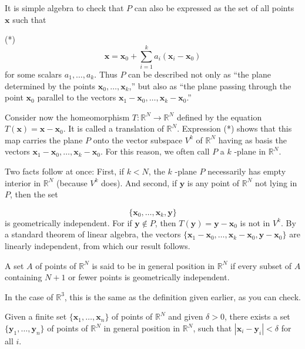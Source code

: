 It is simple algebra to check that \(P\) can also be expressed as the set of all points \(\mathbf{x}\) such that

(*)
\[
\mathbf{x} = \mathbf{x}_{0} + \mathop{\sum }\limits_{{i = 1}}^{k}a_{i}({\mathbf{x}_{i} - \mathbf{x}_{0}})
\]
for some scalars \(a_{1},\ldots ,a_{k}\). Thus \(P\) can be described not only as ``the plane determined by the points \(\mathbf{x}_{0},\ldots ,\mathbf{x}_{k}\),'' but also as ``the plane passing through the point \(\mathbf{x}_{0}\) parallel to the vectors \(\mathbf{x}_{1} - \mathbf{x}_{0},\ldots ,\mathbf{x}_{k} - \mathbf{x}_{0}\).''

Consider now the homeomorphism \(T : \mathbb{R}^{N} \rightarrow {\mathbb{R}}^{N}\) defined by the equation \(T( \mathbf{x}) = \mathbf{x} - \mathbf{x}_{0}\). It is called a translation of \(\mathbb{R}^{N}\). Expression (*) shows that this map carries the plane \(P\) onto the vector subspace \(V^{k}\) of \(\mathbb{R}^{N}\) having as basis the vectors \(\mathbf{x}_{1} - \mathbf{x}_{0},\ldots ,\mathbf{x}_{k} - \mathbf{x}_{0}\). For this reason, we often call \(P\) a \(k\) -plane in \(\mathbb{R}^{N}\).

Two facts follow at once: First, if \(k < N\), the \(k\) -plane \(P\) necessarily has empty interior in \(\mathbb{R}^{N}\) (because \(V^{k}\) does). And second, if \(\mathbf{y}\) is any point of \(\mathbb{R}^{N}\) not lying in \(P\), then the set

\[
\{ {\mathbf{x}_{0},\ldots ,\mathbf{x}_{k},\mathbf{y}}\}
\]
is geometrically independent. For if \(\mathbf{y} \notin P\), then \(T( \mathbf{y}) = \mathbf{y} - \mathbf{x}_{0}\) is not in \(V^{k}\). By a standard theorem of linear algebra, the vectors \(\{ {\mathbf{x}_{1} - \mathbf{x}_{0},\ldots ,\mathbf{x}_{k} - \mathbf{x}_{0},\mathbf{y} - \mathbf{x}_{0}}\}\) are linearly independent, from which our result follows.

\begin{definition}
A set \(A\) of points of \(\mathbb{R}^{N}\) is said to be in general position in \(\mathbb{R}^{N}\) if every subset of \(A\) containing \(N + 1\) or fewer points is geometrically independent.
\end{definition}

In the case of \(\mathbb{R}^{3}\), this is the same as the definition given earlier, as you can check.

\begin{lemma}
\label{lem:\thetheorem}
Given a finite set \(\{ {\mathbf{x}_{1},\ldots ,\mathbf{x}_{n}}\}\) of points of \(\mathbb{R}^{N}\) and given \(\delta > 0\), there exists a set \(\{ {\mathbf{y}_{1},\ldots ,\mathbf{y}_{n}}\}\) of points of \(\mathbb{R}^{N}\) in general position in \(\mathbb{R}^{N}\), such that \(| {\mathbf{x}_{i} - \mathbf{y}_{i}}| < \delta\) for all \(i\).
\end{lemma}

